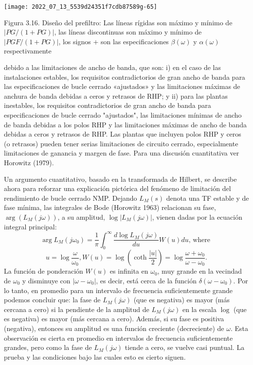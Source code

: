 \texttt{[image: 2022\_07\_13\_5539d24351f7cdb87589g-65]}

Figura 3.16. Diseño del prefiltro: Las líneas rígidas son máximo y mínimo de $| P G /(1+P G)|$, las líneas discontinuas son máximo y mínimo de $| P G F /(1+P G)|$, los signos $+$ son las especificaciones $\beta(\omega)$ y $\alpha(\omega)$ respectivamente

debido a las limitaciones de ancho de banda, que son: i) en el caso de las instalaciones estables, los requisitos contradictorios de gran ancho de banda para las especificaciones de bucle cerrado «ajustados» y las limitaciones máximas de anchura de banda debidas a ceros y retrasos de RHP; y ii) para las plantas inestables, los requisitos contradictorios de gran ancho de banda para especificaciones de bucle cerrado "ajustados", las limitaciones mínimas de ancho de banda debidas a los polos RHP y las limitaciones máximas de ancho de banda debidas a ceros y retrasos de RHP. Las plantas que incluyen polos RHP y ceros (o retrasos) pueden tener serias limitaciones de circuito cerrado, especialmente limitaciones de ganancia y margen de fase. Para una discusión cuantitativa ver Horowitz (1979).

Un argumento cuantitativo, basado en la transformada de Hilbert, se describe ahora para reforzar una explicación pictórica del fenómeno de limitación del rendimiento de bucle cerrado NMP. Dejando $L_{M}(s)$ denota una TF estable y de fase mínima, las integrales de Bode (Horowitz 1963) relacionan su fase, $\arg \left(L_{M}(j \omega)\right)$, a su amplitud, $\log \left| L_{M}(j \omega)\right|$, vienen dadas por la ecuación integral principal:
$$
\arg L_{M}\left(j \omega_{0}\right)=\frac{1}{\pi} \int_{0}^{\infty} \frac{d \log L_{M}(j \omega)}{d u} W(u) d u \text {, where }
$$
$$
u=\log \frac{\omega}{\omega_{0}}, W(u)=\log \left(\operatorname{coth} \frac{|u|} {2}\right)=\log \frac{\omega+\omega_{0}}{\omega-\omega_{0}} .
$$
La función de ponderación $W(u)$ es infinita en $\omega_{0}$, muy grande en la vecindad de $\omega_{0}$ y disminuye con $\left|\omega-\omega_{0}\right|$, es decir, está cerca de la función $\delta\left(\omega-\omega_{0}\right)$. Por lo tanto, en promedio para un intervalo de frecuencia suficientemente grande podemos concluir que: la fase de $L_{M}(j \omega)$ (que es negativa) es mayor (más cercana a cero) si la pendiente de la amplitud de $L_{M}(j \omega)$ en la escala $\log$ (que es negativa) es mayor (más cercana a cero). Además, si su fase es positiva (negativa), entonces su amplitud es una función creciente (decreciente) de $\omega$. Esta observación es cierta en promedio en intervalos de frecuencia suficientemente grandes, pero como la fase de $L_{M}(j \omega)$ tiende a cero, se vuelve casi puntual. La prueba y las condiciones bajo las cuales esto es cierto siguen.

